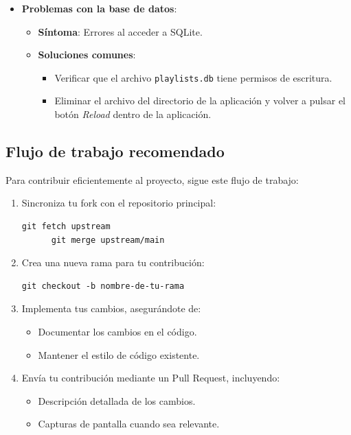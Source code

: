 \documentclass[11pt, a4paper]{article}
\begin{document}
\begin{itemize}
        \item \textbf{Problemas con la base de datos}:
        \begin{itemize}
          \item \textbf{Síntoma}: Errores al acceder a SQLite.
          \item \textbf{Soluciones comunes}:
            \begin{itemize}
              \item Verificar que el archivo \texttt{playlists.db} tiene permisos de escritura.
              \item Eliminar el archivo del directorio de la aplicación y volver a pulsar el botón \textit{Reload} dentro de la aplicación.
            \end{itemize}
        \end{itemize}
    \end{itemize} \newpage

  \subsection{Flujo de trabajo recomendado}

  Para contribuir eficientemente al proyecto, sigue este flujo de trabajo:

  \begin{enumerate}
    \item Sincroniza tu fork con el repositorio principal:
      \begin{lstlisting}[caption={Contribuir 1}]
      git fetch upstream
      git merge upstream/main
      \end{lstlisting}
      
    \item Crea una nueva rama para tu contribución:
      \begin{lstlisting}[caption={Contribuir 2}]
      git checkout -b nombre-de-tu-rama
      \end{lstlisting}
      
    \item Implementa tus cambios, asegurándote de:
      \begin{itemize}
        \item Documentar los cambios en el código.
        \item Mantener el estilo de código existente.
      \end{itemize}
      
    \item Envía tu contribución mediante un Pull Request, incluyendo:
      \begin{itemize}
        \item Descripción detallada de los cambios.
        \item Capturas de pantalla cuando sea relevante.
      \end{itemize}
  \end{enumerate}
\end{document}
